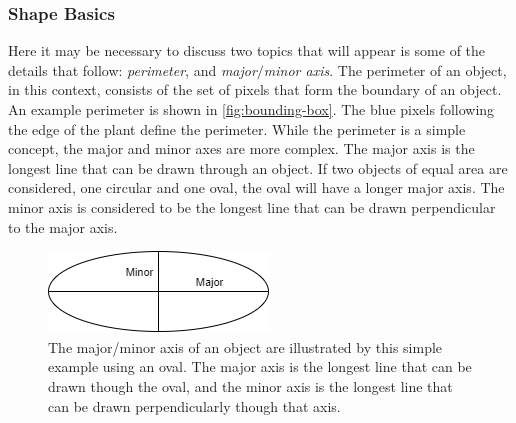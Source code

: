 \documentclass[letterpaper]{report}
\begin{document}
{\subsubsection{Shape Basics}
Here it may be necessary to discuss two topics that will appear is some of the details that follow: \textit{perimeter}, and \textit{major$/$minor axis}. The perimeter of an object, in this context, consists of the set of pixels that form the boundary of an object. An example perimeter is shown in \ref{fig:bounding-box}. The blue pixels following the edge of the plant define the perimeter. While the perimeter is a simple concept, the major and minor axes are more complex. The major axis is the longest line that can be drawn through an object. If two objects of equal area are considered, one circular and one oval, the oval will have a longer major axis. The minor axis is considered to be the longest line that can be drawn perpendicular to the major axis.

\begin{figure}[h!]
	\centering
	\includegraphics[scale=0.5]{./figures/shape-major-minor.png}
	\caption[Major/Minor Axis]{The major/minor axis of an object are illustrated by this simple example using an oval. The major axis is the longest line that can be drawn though the oval, and the minor axis is the longest line that can be drawn perpendicularly though that axis.}
	\label{fig:major-minor}
\end{figure}


}
\end{document}
